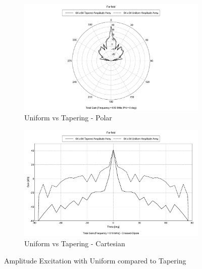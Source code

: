 \documentclass[11pt]{witseiepaper}
\begin{document}
\begin{bibunit}[witseie]
\begin{figure}[htb]
    \centering
    \begin{subfigure}{.5\textwidth}
        \centering
            \includegraphics[width=0.9\linewidth]{AmplitudeTapering-Polar.pdf}
            \caption{Uniform vs Tapering - Polar}
            \label{fig:PowerTapering-Polar}
        \end{subfigure}%
        \begin{subfigure}{.5\textwidth}
            \centering
            \includegraphics[width=0.9\linewidth]{AmplitudeTapering-Cartesian.pdf}
            \caption{Uniform vs Tapering - Cartesian}
                \label{fig:PowerTapering-Cartesian}
            \end{subfigure}
\caption{Amplitude Excitation with Uniform compared to Tapering}
\label{fig:PowerTapering}
\end{figure}




\end{bibunit}
\end{document}
